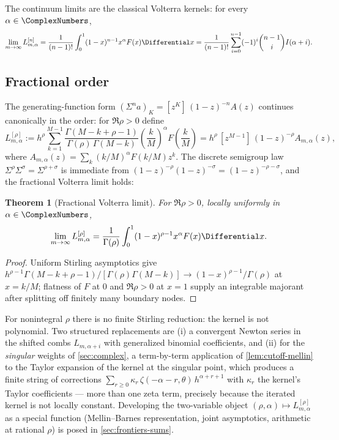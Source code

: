\documentclass[11pt,oneside]{article}
\numberwithin{equation}{section}
\newtheorem{theorem}{Theorem}[section]
\theoremstyle{definition}
\theoremstyle{remark}
\begin{document}
The continuum limits are the classical Volterra kernels: for every
$\alpha\in\ComplexNumbers$,
\begin{equation}
 \lim_{m\to\infty}L^{[n]}_{m,\alpha}
 =\frac{1}{(n-1)!}\int_0^1(1-x)^{n-1}x^{\alpha}F(x)\Differential x
 =\frac{1}{(n-1)!}
 \sum_{i=0}^{n-1}(-1)^{i}\binom{n-1}{i}I(\alpha+i).
 \label{eq:iterated-limit}
\end{equation}

\subsection{Fractional order}

The generating-function form
$(\Sigma^{n}a)_{K}=[z^{K}]\,(1-z)^{-n}A(z)$ continues canonically in
the order: for $\Re\rho>0$ define
\begin{equation}
 L^{[\rho]}_{m,\alpha}
 :=h^{\rho}\sum_{k=1}^{M-1}
 \frac{\Gamma(M-k+\rho-1)}{\Gamma(\rho)\,\Gamma(M-k)}
 \left(\frac kM\right)^{\alpha}F\!\left(\frac kM\right)
 =h^{\rho}\,[z^{M-1}]\,(1-z)^{-\rho}A_{m,\alpha}(z),
 \label{eq:fractional-sum}
\end{equation}
where $A_{m,\alpha}(z)=\sum_k(k/M)^{\alpha}F(k/M)z^{k}$.  The discrete
semigroup law $\Sigma^{\rho}\Sigma^{\sigma}=\Sigma^{\rho+\sigma}$ is
immediate from $(1-z)^{-\rho}(1-z)^{-\sigma}=(1-z)^{-\rho-\sigma}$,
and the fractional Volterra limit holds:

\begin{theorem}[Fractional Volterra limit]
\label{thm:fractional-limit}
For $\Re\rho>0$, locally uniformly in $\alpha\in\ComplexNumbers$,
\begin{equation}
 \lim_{m\to\infty}L^{[\rho]}_{m,\alpha}
 =\frac{1}{\Gamma(\rho)}
 \int_0^1(1-x)^{\rho-1}x^{\alpha}F(x)\Differential x.
 \label{eq:fractional-limit}
\end{equation}
\end{theorem}

\begin{proof}
Uniform Stirling asymptotics give
$h^{\rho-1}\Gamma(M-k+\rho-1)/[\Gamma(\rho)\Gamma(M-k)]
\to(1-x)^{\rho-1}/\Gamma(\rho)$ at $x=k/M$; flatness of $F$ at $0$
and $\Re\rho>0$ at $x=1$ supply an integrable majorant after
splitting off finitely many boundary nodes.
\end{proof}

For nonintegral $\rho$ there is no finite Stirling reduction: the
kernel is not polynomial.  Two structured replacements are (i) a
convergent Newton series in the shifted combs $L_{m,\alpha+i}$ with
generalized binomial coefficients, and (ii) for the \emph{singular}
weights of \cref{sec:complex}, a term-by-term application of
\cref{lem:cutoff-mellin} to the Taylor expansion of the kernel at the
singular point, which produces a finite string of corrections
$\sum_{r\ge0}\kappa_r\,\zeta(-\alpha-r,\theta)\,h^{\alpha+r+1}$ with
$\kappa_r$ the kernel's Taylor coefficients --- more than one zeta
term, precisely because the iterated kernel is not locally constant.
Developing the two-variable object
$(\rho,\alpha)\mapsto L^{[\rho]}_{m,\alpha}$ as a special function
(Mellin--Barnes representation, joint asymptotics, arithmetic at
rational $\rho$) is posed in \cref{sec:frontiers-sums}.
\end{document}
